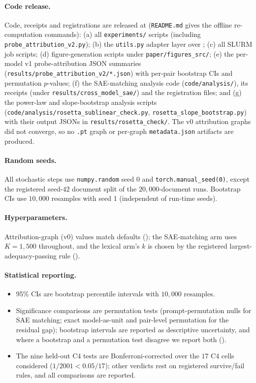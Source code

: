 \paragraph{Code release.}
Code, receipts and registrations are released at \coderepo{}
(\texttt{README.md} gives the offline re-computation commands): (a) all \texttt{experiments/} scripts (including
\texttt{probe\_attribution\_v2.py});
(b) the \texttt{utils.py} adapter layer over \circuittracer{};
(c) all SLURM job scripts;
(d) figure-generation scripts under \texttt{paper/figures\_src/};
(e) the per-model v1 probe-attribution JSON summaries
(\texttt{results/probe\_attribution\_v2/*.json}) with per-pair bootstrap
CIs and permutation $p$-values;
(f) the SAE-matching analysis code (\texttt{code/analysis/}), its receipts
(under \texttt{results/cross\_model\_sae/}) and the registration files; and
(g) the power-law and slope-bootstrap analysis scripts
(\texttt{code/analysis/rosetta\_sublinear\_check.py},
\texttt{rosetta\_slope\_bootstrap.py}) with their output JSONs in
\texttt{results/rosetta\_check/}. The v0 attribution graphs did not
converge, so no \texttt{.pt} graph or per-graph \texttt{metadata.json}
artifacts are produced.

\paragraph{Random seeds.}
All stochastic steps use \texttt{numpy.random} seed 0 and
\texttt{torch.manual\_seed(0)}, except the registered seed-$42$ document split of the
$20{,}000$-document runs. Bootstrap CIs use $10{,}000$ resamples
with seed 1 (independent of run-time seeds).

\paragraph{Hyperparameters.} Attribution-graph (v0) values match \circuittracer{} defaults
(); the SAE-matching arm uses $K{=}1{,}500$ throughout, and the lexical
arm's $k$ is chosen by the registered largest-adequacy-passing rule ().

\paragraph{Statistical reporting.}
\begin{itemize}[leftmargin=*,topsep=2pt,itemsep=2pt]
  \item 95\% CIs are bootstrap percentile intervals with $10{,}000$ resamples.
  \item Significance comparisons are permutation tests (prompt-permutation nulls for
  SAE matching; exact model-as-unit and pair-level permutation for the residual gap);
  bootstrap intervals are reported as descriptive uncertainty, and where a bootstrap
  and a permutation test disagree we report both ().
  \item The nine held-out C4 tests are Bonferroni-corrected over the $17$ C4 cells considered
  ($1/2001<0.05/17$); other verdicts rest on registered survive/fail rules, and all
  comparisons are reported.
\end{itemize}

